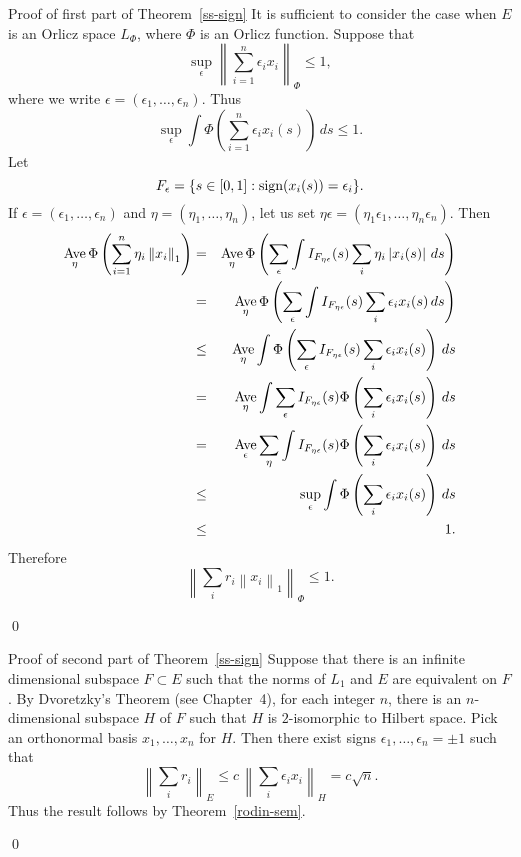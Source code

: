 \documentclass[numreferences]{kluwer}
\def\sign{\mathop{\hbox{sign}}}
\def\normo#1{\left\|#1\right\|}
\def\modo#1{\left|#1\right|}
\def\Ave{\mathop{\hbox{\rm Ave}}\limits}
\begin{document}
\begin{article}
\begin{pf*}{Proof of first part of Theorem~\ref{ss-sign}}
It is sufficient to consider the case when $E$ is an Orlicz space
$L_\Phi$, where $\Phi$ is an Orlicz function.  Suppose that
$$ \sup_\epsilon \normo{\sum_{i=1}^n \epsilon_i x_i}_\Phi \le 1 ,$$
where we write $\epsilon = (\epsilon_1,\dots,\epsilon_n)$.
Thus
$$ \sup_\epsilon \int \Phi\left(\sum_{i=1}^n \epsilon_i x_i(s)
   \right) \, ds \le 1 .$$
Let
$$ F_\epsilon = \{s\in[0,1] : \sign(x_i(s)) = \epsilon_i\} .$$
If $\epsilon = (\epsilon_1,\dots,\epsilon_n)$
and
$\eta = (\eta_1,\dots,\eta_n)$, let us set
$\eta \epsilon = (\eta_1 \epsilon_1,\dots,\eta_n \epsilon_n)$.
Then
\begin{eqnarray*}
   \Ave_\eta \Phi\left(\sum_{i=1}^n \eta_i \normo{x_i}_1\right)
   &=&
   \Ave_\eta \Phi\left(\sum_\epsilon \int I_{F_{\eta \epsilon}}(s)
   \sum_i \eta_i \modo{x_i(s)} \, ds \right) \\
   &=&
   \Ave_\eta \Phi\left(\sum_\epsilon \int I_{F_{\eta \epsilon}}(s)
   \sum_i \epsilon_i x_i(s) \, ds \right) \\
   &\le&
   \Ave_\eta \int \Phi\left(\sum_\epsilon I_{F_{\eta \epsilon}}(s)
   \sum_i \epsilon_i x_i(s) \right) \, ds \\
   &=&
   \Ave_\eta \int \sum_\epsilon I_{F_{\eta \epsilon}}(s)
   \Phi\left(
   \sum_i \epsilon_i x_i(s) \right) \, ds \\
   &=&
   \Ave_\epsilon \sum_\eta \int I_{F_{\eta \epsilon}}(s)
   \Phi\left(
   \sum_i \epsilon_i x_i(s) \right) \, ds \\
   &\le&
   \sup_\epsilon \int
   \Phi\left(
   \sum_i \epsilon_i x_i(s) \right) \, ds \\
   &\le&
   1 . 
\end{eqnarray*}
Therefore
$$ \normo{\sum_i r_i \normo{x_i}_1}_\Phi \le 1 .$$
\end{pf*}\qed

\begin{pf*}{Proof of second part of Theorem~\ref{ss-sign}}
Suppose that there is an infinite dimensional subspace $F \subset E$ such that
the norms of $L_1$ and $E$ are equivalent on $F$.  By Dvoretzky's Theorem 
(see \cite{MSc} Chapter~4),
for each integer $n$, there is an $n$-dimensional subspace $H$ of $F$ such
that $H$ is $2$-isomorphic to Hilbert space.  Pick
an orthonormal basis $x_1,\dots,x_n$ for $H$.  Then there exist signs
$\epsilon_1,\dots,\epsilon_n = \pm 1$ such that
$$ \normo{\sum_i r_i}_E
   \le c \,
   \normo{\sum_i \epsilon_i x_i}_H
   = c \sqrt{n} .$$
Thus the result follows by Theorem~\ref{rodin-sem}.
\end{pf*}\qed


\end{article}
\end{document}

